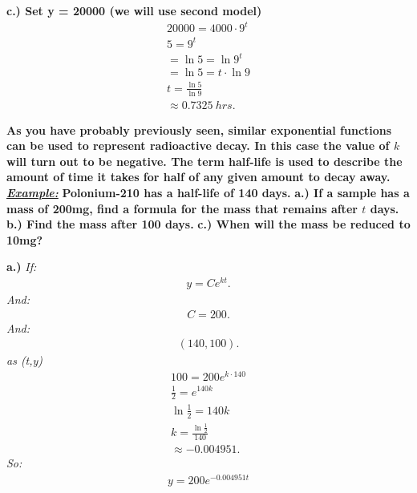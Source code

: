 \documentclass{report}
\begin{document}
    \bigbreak \noindent 
    \textbf{c.) Set y = 20000 (we will use second model)}
    \begin{align*}
      20000 = 4000 \cdot 9^{t} \\ 
      5=  9^{t} \\ 
      = \ln{5} = \ln{9^{t}} \\
      = \ln{5} = t \cdot \ln{9} \\
      t = \frac{\ln{5}}{\ln{9}} \\
      \approx 0.7325\ hrs
    .\end{align*}

    \bigbreak \noindent 
    \begin{mdframed}
      \textbf{As you have probably previously seen, similar exponential functions can be used to 
        represent radioactive decay. In this case the value of $k$ will turn
        out to be negative. The term half-life is used to describe the amount of time
        it takes for half of any given amount to decay away.
      }
      \bigbreak \noindent 
      \textbf{\textit{\underline{Example:}}} \textbf{Polonium-210 has a half-life of 140 days.}
      \bigbreak \noindent 
      \textbf{a.) If a sample has a mass of 200mg, find a formula for the mass that
        remains after $t$ days.
      }
      \smallbreak \noindent
      \textbf{b.) Find the mass after 100 days.}
      \smallbreak \noindent
      \textbf{c.) When will the mass be reduced to 10mg?}
    \end{mdframed}

    \bigbreak \noindent 
    \textbf{a.)}
    \bigbreak \noindent 
    \textit{If:}
    \begin{align*}
      y  = Ce^{kt} 
    .\end{align*}
    \bigbreak \noindent 
    \textit{And:}
    \begin{align*}
      C = 200
    .\end{align*}
    \textit{And:}
    \begin{align*}
      (140, 100)
    .\end{align*}
    \textit{as (t,y)}
    \begin{align*}
      100 = 200e^{k \cdot 140} \\
      \frac{1}{2} = e^{140k} \\
      \ln{\frac{1}{2}} = 140k \\
      k = \frac{\ln{\frac{1}{2}}}{140} \\
      \approx -0.004951
    .\end{align*}
    \bigbreak \noindent
    \textit{So:}
    \begin{align*}
      y = 200e^{-0.004951t}
    \end{align*}
\end{document}
